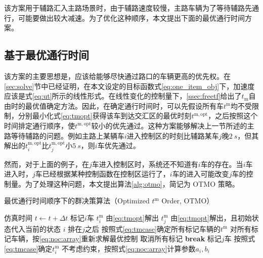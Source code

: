 该方案用于辅路汇入主路场景时，由于辅路速度较慢，主路车辆为了等待辅路先通行，可能要做出较大减速。为了优化这种顺序，本文提出下面的最优通行时间方案。

\subsection{基于最优通行时间}
该方案的主要思想是，应该给能够尽快通过路口的车辆更高的优先权。在\ref{sec:solve}节中已经证明，在本文设定的目标函数式\eqref{eq:one_item_obj}下，加速度应该是式\eqref{eq:ut}所示的线性形式。在线性变化的控制量下，\ref{ssec:freetf}给出了$t_\mathrm{m}$自由时的最优值确定方法。因此，在确定通行时间时，可以先假设所有车$t^\mathrm{m}$均不受限制，分别最小化式\eqref{eq:tmopt}获得该车到达交汇区的最优时刻$t^\mathrm{m,opt}$，之后按照这个时间排定通行顺序，使$t^\mathrm{m,opt}$较小的优先通过。这种方案能够解决上一节所述的主路等待辅路的问题。例如主路上某辆车$i$进入控制区的时刻比辅路某车$j$晚$\SI{2}{s}$，但其解出的$t_i^\mathrm{m,opt}$比$t_j^\mathrm{m,opt}$小$\SI{5}{s}$，则$i$车优先通过。

然而，对于上面的例子，在$j$车进入控制区时，系统还不知道有$i$车的存在。当$i$车进入时，$j$车已经根据某种控制函数在控制区运行了，$i$车的进入可能改变$j$车的控制量。为了处理这种问题，本文提出算法\eqref{alg:otmo}，简记为 OTMO 策略。
\begin{algorithm}[htbp]
\caption{最优通行时间顺序下的群决策算法（Optimized $t^\mathrm{m}$ Order, OTMO）}
\label{alg:otmo}
\begin{algorithmic}
  \Statex
    \State 仿真时间 $t\gets t+\Delta t$
          \State 标记$i$车
            \State $t_i^\mathrm{m}$ 由\eqref{eq:tmopt}解出
            \State $t_j^\mathrm{m}$ 由\eqref{eq:tmopt}解出，且初始状态代入当前的状态
              \State $i$ 排在$j$之后
              \State 按照式\eqref{eq:tmcase}确定所有标记车辆的$t^\mathrm{m}$
              \State 对所有标记车辆，按\eqref{eq:noc:array}重新求解最优控制
              \State 取消所有标记
              \State \textbf{break}
            \EndIf
            \State 标记$j$车
          \EndFor
        \Else
          \State 按照式\eqref{eq:tmcase}确定$t_i^\mathrm{m}$
          \State 不考虑约束，按照式\eqref{eq:noc:array}计算参数$a_i, b_i$
        \EndIf
      \EndFor
    \EndIf
  \EndWhile
\end{algorithmic}
\end{algorithm}

